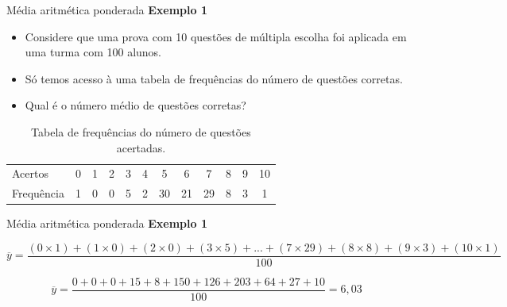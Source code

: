\documentclass[
  ignorenonframetext,
  serif,
  professionalfont,
  usenames,
  dvipsnames,
  aspectratio = 169]{beamer}
\begin{document}
\begin{frame}{Média aritmética ponderada}
\protect\hypertarget{muxe9dia-aritmuxe9tica-ponderada-1}{}
\textbf{Exemplo 1}

\begin{itemize}
\item
  Considere que uma prova com 10 questões de múltipla escolha foi
  aplicada em uma turma com 100 alunos.
\item
  Só temos acesso à uma tabela de frequências do número de questões
  corretas.
\item
  Qual é o número médio de questões corretas?
\end{itemize}

\begin{longtable}[]{@{}lccccccccccc@{}}
\caption{Tabela de frequências do número de questões
acertadas.}\tabularnewline
\toprule()
\endhead
Acertos & 0 & 1 & 2 & 3 & 4 & 5 & 6 & 7 & 8 & 9 & 10 \\
Frequência & 1 & 0 & 0 & 5 & 2 & 30 & 21 & 29 & 8 & 3 & 1 \\
\bottomrule()
\end{longtable}
\end{frame}

\begin{frame}{Média aritmética ponderada}
\protect\hypertarget{muxe9dia-aritmuxe9tica-ponderada-2}{}
\textbf{Exemplo 1}

\[\overline{y} = \dfrac{(0\times1)+(1\times0)+(2\times0)+(3\times5)+...+(7\times29)+(8\times8)+(9\times3)+(10\times1)}{100}\]

\[\overline{y} = \dfrac{0+0+0+15+8+150+126+203+64+27+10}{100}= 6,03\]
\end{frame}
\end{document}

